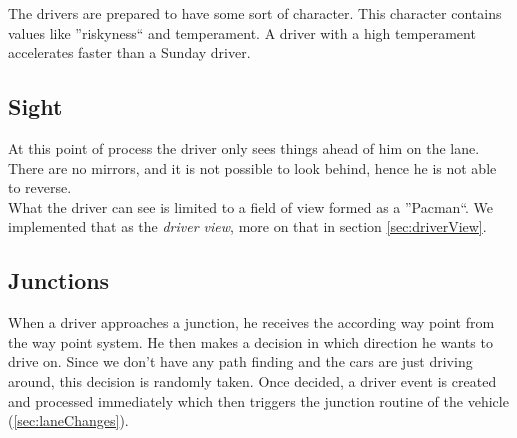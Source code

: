 The drivers are prepared to have some sort of character. This character
contains values like ''riskyness`` and temperament. A driver with a
high temperament accelerates faster than a Sunday driver.

\subsection{Sight}
\label{sec:sight}

At this point of process the driver only sees things ahead of him on the
lane. There are no mirrors, and it is not possible to look behind, hence
he is not able to reverse.\\

\noindent What the driver can see is limited to a field of view formed as 
a ''Pacman``. We implemented that as the \emph{driver view}, more on that in 
section \ref{sec:driverView}.

\subsection{Junctions}
\label{sec:driverJunctions}

When a driver approaches a junction, he receives the according way point
from the way point system. He then makes a decision in which direction he
wants to drive on. Since we don't have any path finding and the cars are
just driving around, this decision is randomly taken. Once decided, a
driver event is created and processed immediately which then triggers
the junction routine of the vehicle (\ref{sec:laneChanges}).

